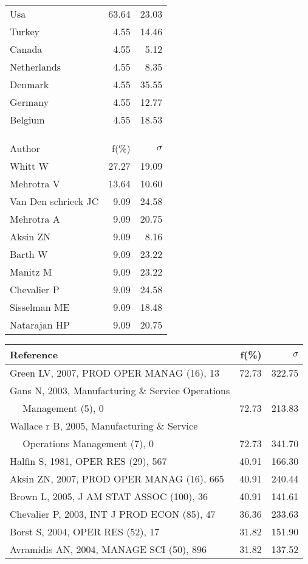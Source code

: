\documentclass[a4paper,11pt]{report}
\begin{document}
\begin{landscape}
\begin{table}[!ht]
{\begin{tabular}{|l r r|}
\hline
Usa & 63.64 & 23.03\\
Turkey & 4.55 & 14.46\\
Canada & 4.55 & 5.12\\
Netherlands & 4.55 & 8.35\\
Denmark & 4.55 & 35.55\\
Germany & 4.55 & 12.77\\
Belgium & 4.55 & 18.53\\
 &  & \\
 &  & \\
 &  & \\
\hline
\hline
Author & f(\%) & $\sigma$\\
\hline
Whitt W & 27.27 & 19.09\\
Mehrotra V & 13.64 & 10.60\\
Van Den schrieck JC & 9.09 & 24.58\\
Mehrotra A & 9.09 & 20.75\\
Aksin ZN & 9.09 & 8.16\\
Barth W & 9.09 & 23.22\\
Manitz M & 9.09 & 23.22\\
Chevalier P & 9.09 & 24.58\\
Sisselman ME & 9.09 & 18.48\\
Natarajan HP & 9.09 & 20.75\\
\hline
\end{tabular}
}
{\scriptsize\begin{tabular}{|l r r|}
\hline
Reference & f(\%) & $\sigma$\\
\hline
Green LV, 2007, PROD OPER MANAG (16), 13 & 72.73 & 322.75\\
Gans N, 2003, Manufacturing \& Service Operations &  & \\
$\quad$ Management (5), 0 & 72.73 & 213.83\\
Wallace r B, 2005, Manufacturing \& Service &  & \\
$\quad$ Operations Management (7), 0 & 72.73 & 341.70\\
Halfin S, 1981, OPER RES (29), 567 & 40.91 & 166.30\\
Aksin ZN, 2007, PROD OPER MANAG (16), 665 & 40.91 & 240.44\\
Brown L, 2005, J AM STAT ASSOC (100), 36 & 40.91 & 141.61\\
Chevalier P, 2003, INT J PROD ECON (85), 47 & 36.36 & 233.63\\
Borst S, 2004, OPER RES (52), 17 & 31.82 & 151.90\\
Avramidis AN, 2004, MANAGE SCI (50), 896 & 31.82 & 137.52\\

\end{tabular}}
\end{table}
\end{landscape}
\end{document}
